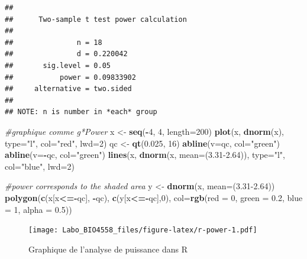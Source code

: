 \documentclass[12pt,]{book}
\newenvironment{Shaded}{\begin{snugshade}}{\end{snugshade}}
\newcommand{\CommentTok}[1]{\textcolor[rgb]{0.56,0.35,0.01}{\textit{#1}}}
\newcommand{\DataTypeTok}[1]{\textcolor[rgb]{0.13,0.29,0.53}{#1}}
\newcommand{\DecValTok}[1]{\textcolor[rgb]{0.00,0.00,0.81}{#1}}
\newcommand{\FloatTok}[1]{\textcolor[rgb]{0.00,0.00,0.81}{#1}}
\newcommand{\KeywordTok}[1]{\textcolor[rgb]{0.13,0.29,0.53}{\textbf{#1}}}
\newcommand{\NormalTok}[1]{#1}
\newcommand{\OperatorTok}[1]{\textcolor[rgb]{0.81,0.36,0.00}{\textbf{#1}}}
\newcommand{\StringTok}[1]{\textcolor[rgb]{0.31,0.60,0.02}{#1}}
\begin{document}
\begin{verbatim}
## 
##      Two-sample t test power calculation 
## 
##               n = 18
##               d = 0.220042
##       sig.level = 0.05
##           power = 0.09833902
##     alternative = two.sided
## 
## NOTE: n is number in *each* group
\end{verbatim}

\begin{Shaded}
\begin{Highlighting}[]
\CommentTok{#graphique comme g*Power}
\NormalTok{x <-}\StringTok{ }\KeywordTok{seq}\NormalTok{(}\OperatorTok{-}\DecValTok{4}\NormalTok{, }\DecValTok{4}\NormalTok{, }\DataTypeTok{length=}\DecValTok{200}\NormalTok{)}
\KeywordTok{plot}\NormalTok{(x, }\KeywordTok{dnorm}\NormalTok{(x), }\DataTypeTok{type=}\StringTok{"l"}\NormalTok{, }\DataTypeTok{col=}\StringTok{"red"}\NormalTok{, }\DataTypeTok{lwd=}\DecValTok{2}\NormalTok{)}
\NormalTok{qc <-}\StringTok{ }\KeywordTok{qt}\NormalTok{(}\FloatTok{0.025}\NormalTok{, }\DecValTok{16}\NormalTok{)}
\KeywordTok{abline}\NormalTok{(}\DataTypeTok{v=}\NormalTok{qc, }\DataTypeTok{col=}\StringTok{"green"}\NormalTok{)}
\KeywordTok{abline}\NormalTok{(}\DataTypeTok{v=}\OperatorTok{-}\NormalTok{qc, }\DataTypeTok{col=}\StringTok{"green"}\NormalTok{)}
\KeywordTok{lines}\NormalTok{(x, }\KeywordTok{dnorm}\NormalTok{(x, }\DataTypeTok{mean=}\NormalTok{(}\FloatTok{3.31-2.64}\NormalTok{)), }\DataTypeTok{type=}\StringTok{"l"}\NormalTok{, }\DataTypeTok{col=}\StringTok{"blue"}\NormalTok{, }\DataTypeTok{lwd=}\DecValTok{2}\NormalTok{)}

\CommentTok{#power corresponds to the shaded area}
\NormalTok{y <-}\StringTok{ }\KeywordTok{dnorm}\NormalTok{(x, }\DataTypeTok{mean=}\NormalTok{(}\FloatTok{3.31-2.64}\NormalTok{))}
\KeywordTok{polygon}\NormalTok{(}\KeywordTok{c}\NormalTok{(x[x}\OperatorTok{<=-}\NormalTok{qc], }\OperatorTok{-}\NormalTok{qc),  }\KeywordTok{c}\NormalTok{(y[x}\OperatorTok{<=-}\NormalTok{qc],}\DecValTok{0}\NormalTok{), }\DataTypeTok{col=}\KeywordTok{rgb}\NormalTok{(}\DataTypeTok{red =} \DecValTok{0}\NormalTok{, }\DataTypeTok{green =} \FloatTok{0.2}\NormalTok{, }\DataTypeTok{blue =} \DecValTok{1}\NormalTok{, }\DataTypeTok{alpha =} \FloatTok{0.5}\NormalTok{))}
\end{Highlighting}
\end{Shaded}

\begin{figure}
\centering
\texttt{[image: Labo\_BIO4558\_files/figure-latex/r-power-1.pdf]}
\caption{\label{fig:r-power}Graphique de l'analyse de puissance dans R}
\end{figure}
\end{document}
